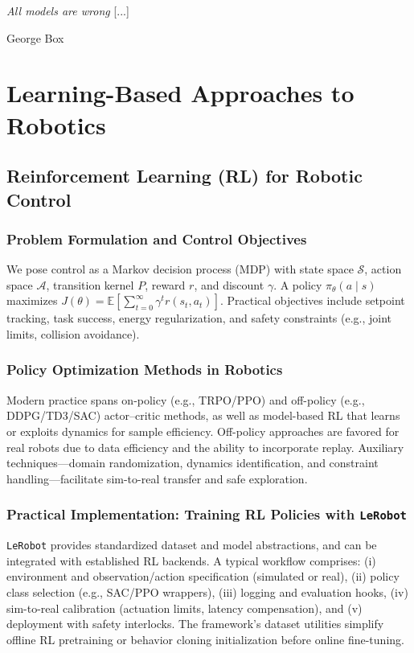 \epigraph{\textit{All models are wrong} [...]}{George Box}

\section{Learning-Based Approaches to Robotics}
\label{sec:learning}

\subsection{Reinforcement Learning (RL) for Robotic Control}
\subsubsection{Problem Formulation and Control Objectives}
We pose control as a Markov decision process (MDP) with state space \(\mathcal{S}\), action space \(\mathcal{A}\), transition kernel \(P\), reward \(r\), and discount \(\gamma\). A policy \(\pi_\theta(a\!\mid\!s)\) maximizes \(J(\theta)=\mathbb{E}\!\left[\sum_{t=0}^{\infty}\gamma^t r(s_t,a_t)\right]\). Practical objectives include setpoint tracking, task success, energy regularization, and safety constraints (e.g., joint limits, collision avoidance).

\subsubsection{Policy Optimization Methods in Robotics}
Modern practice spans on-policy (e.g., TRPO/PPO) and off-policy (e.g., DDPG/TD3/SAC) actor–critic methods, as well as model-based RL that learns or exploits dynamics for sample efficiency. Off-policy approaches are favored for real robots due to data efficiency and the ability to incorporate replay. Auxiliary techniques—domain randomization, dynamics identification, and constraint handling—facilitate sim-to-real transfer and safe exploration.

\subsubsection{Practical Implementation: Training RL Policies with \texttt{LeRobot}}
\texttt{LeRobot} provides standardized dataset and model abstractions, and can be integrated with established RL backends. A typical workflow comprises: (i) environment and observation/action specification (simulated or real), (ii) policy class selection (e.g., SAC/PPO wrappers), (iii) logging and evaluation hooks, (iv) sim-to-real calibration (actuation limits, latency compensation), and (v) deployment with safety interlocks. The framework’s dataset utilities simplify offline RL pretraining or behavior cloning initialization before online fine-tuning.

